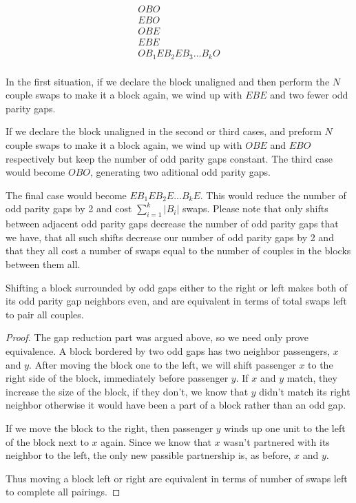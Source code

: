 \begin{align*}
O B O \\
E B O \\
O B E \\
E B E \\
O B_1 E B_2 E B_3 \hdots B_k O \\
\end{align*}

In the first situation, if we declare the block unaligned and then perform the $N$ couple swaps to make it a block again, we wind up with $E B E$ and two fewer odd parity gaps.  

If we declare the block unaligned in the second or third cases, and preform $N$ couple swaps to make it a block again, we wind up with $O B E $ and $E B O$ respectively but keep the number of odd parity gaps constant.  The third case would become $O B O$, generating two aditional odd parity gaps.

The final case would become $E B_1 E B_2 E \hdots B_k E$.  This would reduce the number of odd parity gaps by 2 and cost $\sum_{i=1}^k |B_i|$ swaps.  Please note that only shifts between adjacent odd parity gaps decrease the number of odd parity gaps that we have, that all such shifts decrease our number of odd parity gaps by 2 and that they all cost a number of swaps equal to the number of couples in the blocks between them all.

\begin{lem} \label{lem:shiftLeftRightIdentical}
Shifting a block surrounded by odd gaps either to the right or left makes both of its odd parity gap neighbors even, and are equivalent in terms of total swaps left to pair all couples.
\end{lem}

\begin{proof}
The gap reduction part was argued above, so we need only prove equivalence.  A block bordered by two odd gaps has two neighbor passengers, $x$ and $y$.  After moving the block one to the left, we will shift passenger $x$ to the right side of the block, immediately before passenger $y$.  If $x$ and $y$ match, they increase the size of the block, if they don't, we know that $y$ didn't match its right neighbor otherwise it would have been a part of a block rather than an odd gap.

If we move the block to the right, then passenger $y$ winds up one unit to the left of the block next to $x$ again. Since we know that $x$ wasn't partnered with its neighbor to the left, the only new passible partnership is, as before, $x$ and $y$.

Thus moving a block left or right are equivalent in terms of number of swaps left to complete all pairings.
\end{proof}


